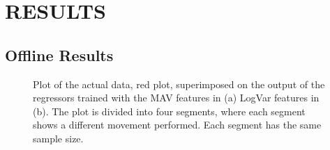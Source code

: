 \section*{RESULTS}%

\subsection*{Offline Results}


\begin{figure}[H]
	\centering
	\label{fig:SuperPositionTraining}
	\caption{Plot of the actual data, red plot, superimposed on the output of the regressors trained with the MAV features in (a) LogVar features in (b). The plot is divided into four segments, where each segment shows a different movement performed. Each segment has the same sample size.}
\end{figure}

